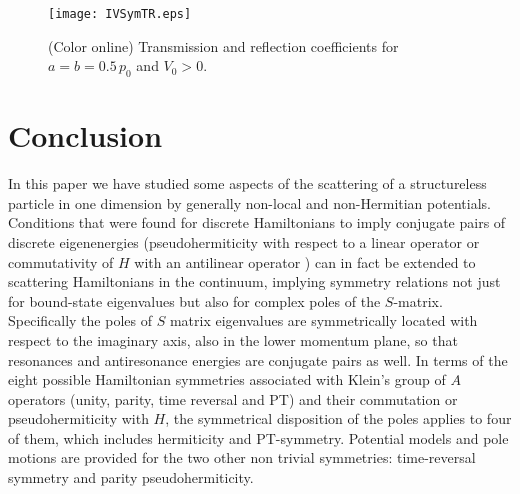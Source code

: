 

\begin{figure}[t]
\begin{center}
\texttt{[image: IVSymTR.eps]}
\end{center}
\caption{(Color online) Transmission and reflection coefficients for $a=b=0.5\, p_0$ and $V_0>0$.}
\label{fig:T_R_fig2}
\end{figure}



%

\section{Conclusion}
\label{sec:RealEigenConclusions}

In this paper we have studied some aspects of the scattering of a structureless particle in one dimension by
generally non-local and non-Hermitian potentials.
Conditions that were found for discrete Hamiltonians to imply conjugate pairs of discrete eigenenergies
(pseudohermiticity with respect to a linear operator or commutativity of $H$ with an antilinear operator \cite{Mostafazadeh2002,Mostafazadeh2002a,Mostafazadeh2002b}) can in fact be extended to scattering Hamiltonians in the continuum, implying symmetry relations not just for bound-state eigenvalues
but also for complex
poles of the $S$-matrix. Specifically the poles of $S$ matrix eigenvalues
are symmetrically located with respect to the imaginary axis, also in the lower momentum plane, so that resonances and antiresonance
energies are conjugate pairs as well.
In  terms of the eight possible Hamiltonian symmetries associated with Klein's group of $A$ operators (unity, parity, time reversal and PT)
and their commutation or pseudohermiticity with $H$,
the symmetrical disposition of the poles applies to four of them, which includes hermiticity and PT-symmetry. Potential models
and pole motions are provided for the
two other non trivial symmetries: time-reversal symmetry and parity pseudohermiticity.

